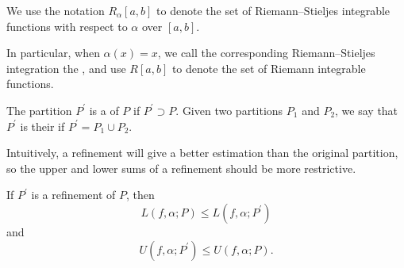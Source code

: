 \begin{notation}
We use the notation $R_\alpha[a,b]$ to denote the set of Riemann--Stieljes integrable functions with respect to $\alpha$ over $[a,b]$.
\end{notation}

In particular, when $\alpha(x)=x$, we call the corresponding Riemann--Stieljes integration the , and use $R[a,b]$ to denote the set of Riemann integrable functions.

\begin{definition}
The partition $P^\prime$ is a  of $P$ if $P^\prime\supset P$. Given two partitions $P_1$ and $P_2$, we say that $P^\prime$ is their  if $P^\prime=P_1\cup P_2$.
\end{definition}

Intuitively, a refinement will give a better estimation than the original partition, so the upper and lower sums of a refinement should be more restrictive.

\begin{proposition}
If $P^\prime$ is a refinement of $P$, then
\[ L(f,\alpha;P)\le L(f,\alpha;P^\prime) \]
and
\[ U(f,\alpha;P^\prime)\le U(f,\alpha;P). \]
\end{proposition}


